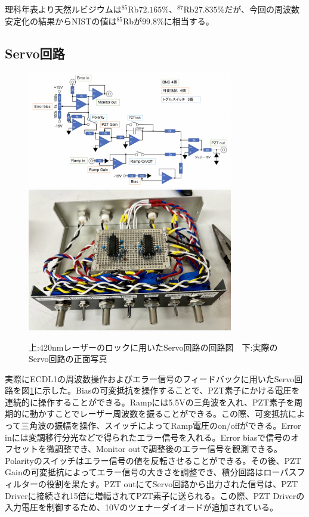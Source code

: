 \documentclass[dvipdfmx]{jsreport}
\begin{document}
理科年表より天然ルビジウムは$^{85}$Rb$72.165\%$、$^{87}$Rb$27.835\%$だが、今回の周波数安定化の結果からNISTの値は$^{85}$Rbが$99.8\%$に相当する。

\subsection{Servo回路}

\begin{figure}
\centering
\includegraphics[width=0.8\textwidth]{images/servo.png}
\includegraphics[width=0.8\textwidth]{images/servo_real.jpg}
\caption{\label{fig:servo}上:420nmレーザーのロックに用いたServo回路の回路図　下:実際のServo回路の正面写真}
\end{figure}

実際にECDL1の周波数操作およびエラー信号のフィードバックに用いたServo回路を図\ref{fig:servo}に示した。Biasの可変抵抗を操作することで、PZT素子にかける電圧を連続的に操作することができる。Rampには5.5Vの三角波を入れ、PZT素子を周期的に動かすことでレーザー周波数を振ることができる。この際、可変抵抗によって三角波の振幅を操作、スイッチによってRamp電圧のon/offができる。Error inには変調移行分光などで得られたエラー信号を入れる。Error biasで信号のオフセットを微調整でき、Monitor outで調整後のエラー信号を観測できる。Polarityのスイッチはエラー信号の値を反転させることができる。その後、PZT Gainの可変抵抗によってエラー信号の大きさを調整でき、積分回路はローパスフィルターの役割を果たす。PZT outにてServo回路から出力された信号は、PZT Driverに接続され15倍に増幅されてPZT素子に送られる。この際、PZT Driverの入力電圧を制御するため、10Vのツェナーダイオードが追加されている。
\end{document}
